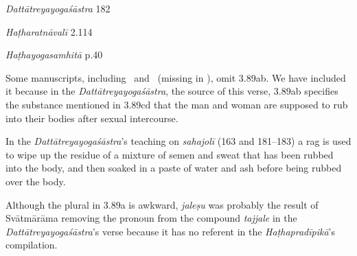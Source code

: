 \begin{ekdosis}
\begin{sources}[hp03_089]
\emph{Dattātreyayogaśāstra} 182
\begin{versinnote}
\tl{\var{182a tajjale bhasma saṃkṣipya ] M2; tajjale bhasmasāt kṣipya M1, tajjale bhasma saddravyaṃ A}\\!}
\end{versinnote}

\end{sources}

\begin{testimonia}[hp03_089]
\emph{Haṭharatnāvalī} 2.114
\begin{versinnote}
\end{versinnote}

\emph{Haṭhayogasamhitā} p.40
\begin{versinnote}
\end{versinnote}
\end{testimonia}

\begin{philcomm}[hp03_089]
Some manuscripts, including \alphaTwo\ and \alphaThree\ (missing in \alphaOne), omit 3.89ab. We have included it because in the \emph{Dattātreyayogaśāstra}, the source of this verse, 3.89ab specifies the substance mentioned in 3.89cd that the man and woman are supposed to rub into their bodies after sexual intercourse.

In the \emph{Dattātreyayogaśāstra}’s teaching on \emph{sahajolī} (163 and 181–183) a rag is used to wipe up the residue of a mixture of semen and sweat that has been rubbed into the body, and then soaked in a paste of water and ash before being rubbed over the body.

Although the plural in 3.89a is awkward, \emph{jaleṣu} was probably the result of Svātmārāma removing the pronoun from the compound \emph{tajjale} in the \emph{Dattātreyayogaśāstra}'s verse because it has no referent in the \emph{Haṭhapradīpikā}'s compilation.
\end{philcomm}


\end{ekdosis}
